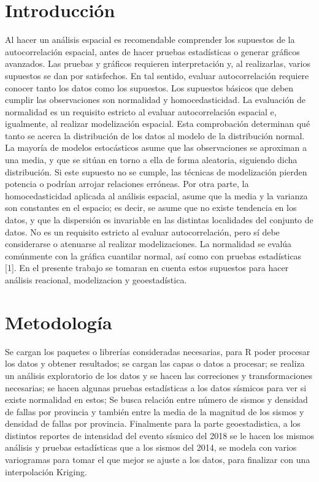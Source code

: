 \documentclass[11pt,]{article}
\begin{document}
\vskip 6.5pt


\noindent  \section{Introducción}\label{introducciuxf3n}

Al hacer un análisis espacial es recomendable comprender los supuestos
de la autocorrelación espacial, antes de hacer pruebas estadísticas o
generar gráficos avanzados. Las pruebas y gráficos requieren
interpretación y, al realizarlas, varios supuestos se dan por
satisfechos. En tal sentido, evaluar autocorrelación requiere conocer
tanto los datos como los supuestos. Los supuestos básicos que deben
cumplir las observaciones son normalidad y homocedasticidad. La
evaluación de normalidad es un requisito estricto al evaluar
autocorrelación espacial e, igualmente, al realizar modelización
espacial. Esta comprobación determinan qué tanto se acerca la
distribución de los datos al modelo de la distribución normal. La
mayoría de modelos estocásticos asume que las observaciones se aproximan
a una media, y que se sitúan en torno a ella de forma aleatoria,
siguiendo dicha distribución. Si este supuesto no se cumple, las
técnicas de modelización pierden potencia o podrían arrojar relaciones
erróneas. Por otra parte, la homocedasticidad aplicada al análisis
espacial, asume que la media y la varianza son constantes en el espacio;
es decir, se asume que no existe tendencia en los datos, y que la
dispersión es invariable en las distintas localidades del conjunto de
datos. No es un requisito estricto al evaluar autocorrelación, pero sí
debe considerarse o atenuarse al realizar modelizaciones. La normalidad
se evalúa comúnmente con la gráfica cuantilar normal, así como con
pruebas estadísticas {[}1{]}. En el presente trabajo se tomaran en
cuenta estos supuestos para hacer análisis reacional, modelizacion y
geoestadística.

\section{Metodología}\label{metodologuxeda}

Se cargan los paquetes o librerías consideradas necesarias, para R poder
procesar los datos y obtener resultados; se cargan las capas o datos a
procesar; se realiza un análisis exploratorio de los datos y se hacen
las correciones y transformaciones necesarias; se hacen algunas pruebas
estadísticas a los datos sísmicos para ver si existe normalidad en
estos; Se busca relación entre número de sismos y densidad de fallas por
provincia y también entre la media de la magnitud de los sismos y
densidad de fallas por provincia. Finalmente para la parte
geoestadistica, a los distintos reportes de intensidad del evento
sísmico del 2018 se le hacen los mismos análisis y pruebas estadísticas
que a los sismos del 2014, se modela con varios variogramas para tomar
el que mejor se ajuste a los datos, para finalizar con una interpolación
Kriging.
\end{document}
